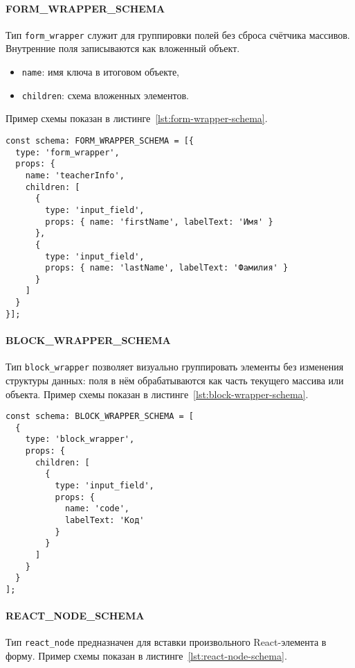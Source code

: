 \paragraph{FORM\_WRAPPER\_SCHEMA}
Тип \texttt{form\_wrapper} служит для группировки полей без сброса счётчика массивов. Внутренние поля записываются как вложенный объект.

\begin{itemize}
  \item \texttt{name}: имя ключа в итоговом объекте,
  \item \texttt{children}: схема вложенных элементов.
\end{itemize}

Пример схемы показан в листинге~\ref{lst:form-wrapper-schema}.

\begin{lstlisting}[caption={Пример \texttt{FORM\_WRAPPER\_SCHEMA}},label={lst:form-wrapper-schema}]
const schema: FORM_WRAPPER_SCHEMA = [{
  type: 'form_wrapper',
  props: {
    name: 'teacherInfo',
    children: [
      {
        type: 'input_field',
        props: { name: 'firstName', labelText: 'Имя' }
      },
      {
        type: 'input_field',
        props: { name: 'lastName', labelText: 'Фамилия' }
      }
    ]
  }
}];
\end{lstlisting}

\paragraph{BLOCK\_WRAPPER\_SCHEMA}
Тип \texttt{block\_wrapper} позволяет визуально группировать элементы без изменения структуры данных: поля в нём обрабатываются как часть текущего массива или объекта. Пример схемы показан в листинге~\ref{lst:block-wrapper-schema}.

\begin{lstlisting}[caption={Пример \texttt{BLOCK\_WRAPPER\_SCHEMA}},label={lst:block-wrapper-schema}]
const schema: BLOCK_WRAPPER_SCHEMA = [
  {
    type: 'block_wrapper',
    props: {
      children: [
        {
          type: 'input_field',
          props: {
            name: 'code',
            labelText: 'Код'
          }
        }
      ]
    }
  }
];
\end{lstlisting}

\paragraph{REACT\_NODE\_SCHEMA}
Тип \texttt{react\_node} предназначен для вставки произвольного React-элемента в форму. Пример схемы показан в листинге~\ref{lst:react-node-schema}.


